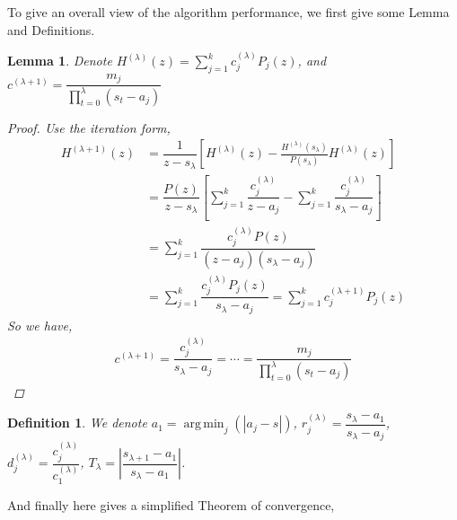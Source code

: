 \documentclass[11pt]{article}
\newtheorem{lemma}[theorem]{Lemma}
\newtheorem{definition}[theorem]{Definition}
\DeclareMathOperator*{\argmin}{arg\,min}
\begin{document}
To give an overall view of the algorithm performance, we first give some Lemma and Definitions.
\begin{lemma}
	Denote $H^{(\lambda)}(z)=\sum_{j=1}^{k}c^{(\lambda)}_jP_j(z)$, and $c^{(\lambda+1)}=\dfrac{m_j}{\prod_{t=0}^{\lambda}(s_t-a_j)}$
	\begin{proof}
		Use the iteration form,
		\begin{align*}
			H^{(\lambda+1)}(z)&=\dfrac{1}{z-s_\lambda}[H^{(\lambda)}(z)-\frac{H^{(\lambda)}(s_\lambda)}{P(s_\lambda)}H^{(\lambda)}(z)]\\
			&=\dfrac{P(z)}{z-s_\lambda}[\sum_{j=1}^{k}\dfrac{c^{(\lambda)}_j}{z-a_j}-\sum_{j=1}^{k}\dfrac{c^{(\lambda)}_j}{s_\lambda-a_j}]\\
			&=\sum_{j=1}^{k}\dfrac{c^{(\lambda)}_jP(z)}{(z-a_j)(s_\lambda-a_j)}\\
			&=\sum_{j=1}^{k}\dfrac{c^{(\lambda)}_jP_j(z)}{s_\lambda-a_j}=\sum_{j=1}^{k}c^{(\lambda+1)}_jP_j(z)
		\end{align*}
		So we have,
		\begin{align*}
			c^{(\lambda+1)}=\dfrac{c^{(\lambda)}_j}{s_\lambda-a_j}=\cdots=\dfrac{m_j}{\prod_{t=0}^{\lambda}(s_t-a_j)}
		\end{align*}
	\end{proof}
\end{lemma}
\begin{definition}
	We denote $a_1=\argmin_j(|a_j-s|)$,  $r^{(\lambda)}_j=\dfrac{s_\lambda-a_1}{s_\lambda-a_j}$, $d^{(\lambda)}_j=\dfrac{c^{(\lambda)}_j}{c^{(\lambda)}_1}$, $T_\lambda=|\dfrac{s_{\lambda+1}-a_1}{s_{\lambda}-a_1}|$.
\end{definition}
And finally here gives a simplified Theorem of convergence,
\end{document}
